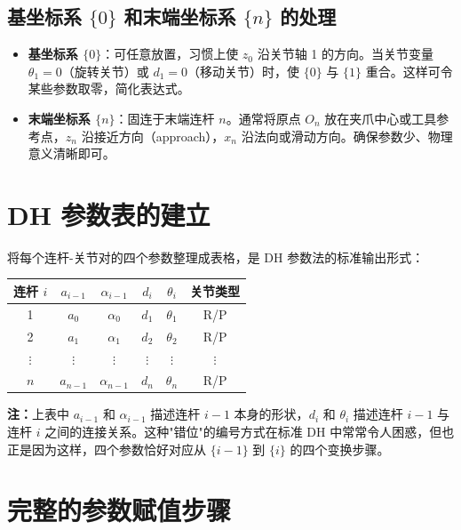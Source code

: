 \subsection{基坐标系 $\{0\}$ 和末端坐标系 $\{n\}$ 的处理}

\begin{itemize}
	\item \textbf{基坐标系 $\{0\}$}：可任意放置，习惯上使 $z_0$ 沿关节轴 1 的方向。当关节变量 $\theta_1 = 0$（旋转关节）或 $d_1 = 0$（移动关节）时，使 $\{0\}$ 与 $\{1\}$ 重合。这样可令某些参数取零，简化表达式。
	
	\item \textbf{末端坐标系 $\{n\}$}：固连于末端连杆 $n$。通常将原点 $O_n$ 放在夹爪中心或工具参考点，$z_n$ 沿接近方向（approach），$x_n$ 沿法向或滑动方向。确保参数少、物理意义清晰即可。
\end{itemize}

\section{DH 参数表的建立}

将每个连杆-关节对的四个参数整理成表格，是 DH 参数法的标准输出形式：

\begin{center}
	\begin{tabular}{cccccc}
		\toprule
		连杆 $i$ & $a_{i-1}$ & $\alpha_{i-1}$ & $d_i$ & $\theta_i$ & 关节类型 \\
		\midrule
		1 & $a_0$   & $\alpha_0$   & $d_1$   & $\theta_1$ & R/P \\
		2 & $a_1$   & $\alpha_1$   & $d_2$   & $\theta_2$ & R/P \\
		$\vdots$ & $\vdots$ & $\vdots$ & $\vdots$ & $\vdots$ & $\vdots$ \\
		$n$ & $a_{n-1}$ & $\alpha_{n-1}$ & $d_n$ & $\theta_n$ & R/P \\
		\bottomrule
	\end{tabular}
\end{center}

\textbf{注：}上表中 $a_{i-1}$ 和 $\alpha_{i-1}$ 描述连杆 $i-1$ 本身的形状，$d_i$ 和 $\theta_i$ 描述连杆 $i-1$ 与连杆 $i$ 之间的连接关系。这种"错位"的编号方式在标准 DH 中常常令人困惑，但也正是因为这样，四个参数恰好对应从 $\{i-1\}$ 到 $\{i\}$ 的四个变换步骤。

\section{完整的参数赋值步骤}

